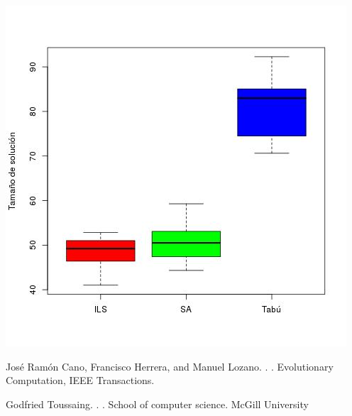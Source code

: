 \documentclass[11pt]{article}
\begin{document}
\begin{center}
  \includegraphics[scale=0.4]{sizes.jpeg}~\\[1cm]
\end{center}





%
%

\begin{thebibliography}{}

José Ramón Cano, Francisco Herrera, and Manuel Lozano.
.
.
\newblock Evolutionary Computation, IEEE Transactions.

Godfried Toussaing.
.
.
\newblock School of computer science. McGill University

\end{thebibliography}
\end{document}
